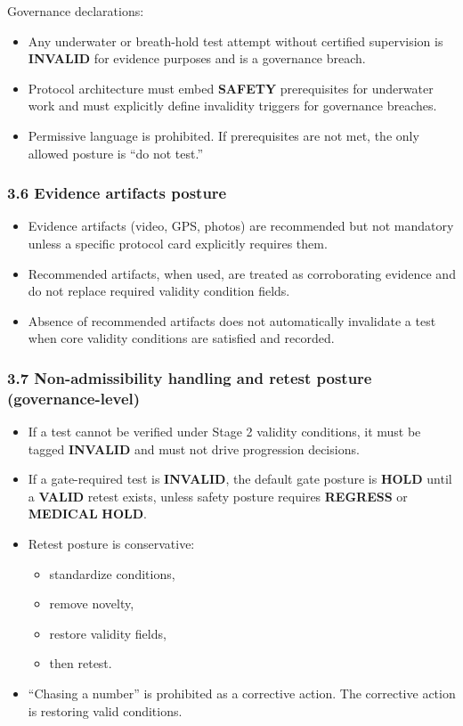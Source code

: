 \documentclass[10pt]{article}
\begin{document}
Governance declarations:

\begin{itemize}
\item Any underwater or breath-hold test attempt without certified supervision is \textbf{INVALID} for evidence purposes and is a governance breach.
\item Protocol architecture must embed \textbf{SAFETY} prerequisites for underwater work and must explicitly define invalidity triggers for governance breaches.
\item Permissive language is prohibited. If prerequisites are not met, the only allowed posture is “do not test.”
\end{itemize}

\subsubsection*{3.6 Evidence artifacts posture}

\begin{itemize}
\item Evidence artifacts (video, GPS, photos) are recommended but not mandatory unless a specific protocol card explicitly requires them.
\item Recommended artifacts, when used, are treated as corroborating evidence and do not replace required validity condition fields.
\item Absence of recommended artifacts does not automatically invalidate a test when core validity conditions are satisfied and recorded.
\end{itemize}

\subsubsection*{3.7 Non-admissibility handling and retest posture (governance-level)}

\begin{itemize}
\item If a test cannot be verified under Stage 2 validity conditions, it must be tagged \textbf{INVALID} and must not drive progression decisions.
\item If a gate-required test is \textbf{INVALID}, the default gate posture is \textbf{HOLD} until a \textbf{VALID} retest exists, unless safety posture requires \textbf{REGRESS} or \textbf{MEDICAL} \textbf{HOLD}.
\item Retest posture is conservative:
  \begin{itemize}
  \item standardize conditions,
  \item remove novelty,
  \item restore validity fields,
  \item then retest.
  \end{itemize}
\item “Chasing a number” is prohibited as a corrective action. The corrective action is restoring valid conditions.
\end{itemize}
\end{document}

